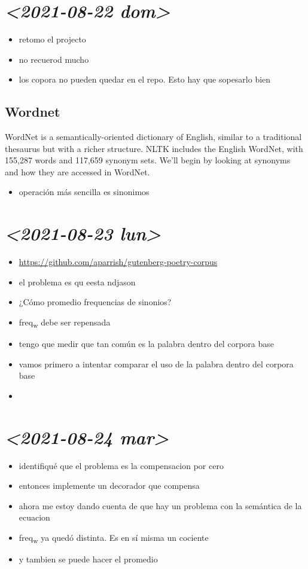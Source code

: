 \documentclass[11pt]{article}
\author{jonatan}
\date{\today}
\title{}
\begin{document}
\tableofcontents

\section{\textit{<2021-08-22 dom>}}
\label{sec:org2060daa}
\begin{itemize}
\item retomo el projecto
\item no recuerod mucho
\item los copora no pueden quedar en el repo. Esto hay que sopesarlo bien
\end{itemize}

\subsection{Wordnet}
\label{sec:org647aff8}
WordNet is a semantically-oriented dictionary of English, similar to a
traditional thesaurus but with a richer structure. NLTK includes the English
WordNet, with 155,287 words and 117,659 synonym sets. We'll begin by looking at
synonyms and how they are accessed in WordNet.

\begin{itemize}
\item operación más sencilla es sinonimos
\end{itemize}


\section{\textit{<2021-08-23 lun>}}
\label{sec:orgc1cde21}

\begin{itemize}
\item \url{https://github.com/aparrish/gutenberg-poetry-corpus}
\item el problema es qu eesta ndjason
\item ¿Cómo promedio frequencias de sinonios?
\item freq\textsubscript{w} debe ser repensada
\item tengo que medir que tan común es la palabra dentro del corpora base
\item vamos primero a intentar comparar el uso de la palabra dentro del corpora base
\item 
\end{itemize}
\section{\textit{<2021-08-24 mar>}}
\label{sec:orgc0027fa}
\begin{itemize}
\item identifiqué que el problema es la compensacion por cero
\item entonces implemente un decorador que compensa
\item ahora me estoy dando cuenta de que hay un problema con la semántica de la ecuacion
\item freq\textsubscript{w} ya quedó distinta. Es en sí misma un cociente
\item y tambien se puede hacer el promedio
\end{itemize}
\end{document}
